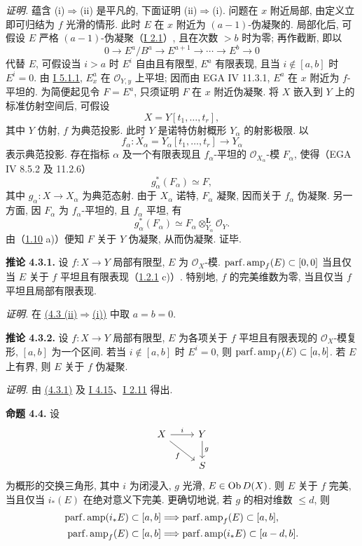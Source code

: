 \emph{证明.} 蕴含 (i)\(\Rightarrow\)(ii) 是平凡的, 下面证明 (ii)\(\Rightarrow\)(i). 问题在 \(x\) 附近局部, 由定义立即可归结为 \(f\) 光滑的情形. 此时 \(E\) 在 \(x\) 附近为 \((a-1)\)-伪凝聚的. 局部化后, 可假设 \(E\) 严格 \((a-1)\)-伪凝聚（\hyperlink{sga6.e01.def.2-1}{I 2.1}）, 且在次数 \(>b\) 时为零; 再作截断, 即以
\[
0\longrightarrow E^a/B^a\longrightarrow E^{a+1}\longrightarrow\cdots\longrightarrow E^b\longrightarrow0
\]
代替 \(E\), 可假设当 \(i>a\) 时 \(E^i\) 自由且有限型, \(E^a\) 有限表现, 且当 \(i\notin[a,b]\) 时 \(E^i=0\). 由 \hyperlink{sga6.e01.lem.5-1-1}{I 5.1.1}, \(E_x^a\) 在 \(\mathcal O_{Y,y}\) 上平坦; 因而由 EGA IV 11.3.1, \(E^a\) 在 \(x\) 附近为 \(f\)-平坦的. 为简便起见令 \(F=E^a\), 只须证明 \(F\) 在 \(x\) 附近伪凝聚. 将 \(X\) 嵌入到 \(Y\) 上的标准仿射空间后, 可假设
\[
X=Y[t_1,\ldots,t_r],
\]
其中 \(Y\) 仿射, \(f\) 为典范投影. 此时 \(Y\) 是诺特仿射概形 \(Y_\alpha\) 的射影极限. 以
\[
f_\alpha:X_\alpha=Y_\alpha[t_1,\ldots,t_r]\longrightarrow Y_\alpha
\]
表示典范投影. 存在指标 \(\alpha\) 及一个有限表现且 \(f_\alpha\)-平坦的 \(\mathcal O_{X_\alpha}\)-模 \(F_\alpha\), 使得（EGA IV 8.5.2 及 11.2.6）
\[
g_\alpha^*(F_\alpha)\simeq F,
\]
其中 \(g_\alpha:X\to X_\alpha\) 为典范态射. 由于 \(X_\alpha\) 诺特, \(F_\alpha\) 凝聚, 因而关于 \(f_\alpha\) 伪凝聚. 另一方面, 因 \(F_\alpha\) 为 \(f_\alpha\)-平坦的, 且 \(f_\alpha\) 平坦, 有
\[
g_\alpha^*(F_\alpha)\simeq F_\alpha\otimes_{Y_\alpha}^{\mathbf L}\mathcal O_Y.
\]
由（\hyperlink{sga6.e03.cor.1-10}{1.10} a)）便知 \(F\) 关于 \(Y\) 伪凝聚, 从而伪凝聚. 证毕.

\textbf{推论 4.3.1.} 设 \(f:X\to Y\) 局部有限型, \(E\) 为 \(\mathcal O_X\)-模. \(\operatorname{parf.amp}_f(E)\subset[0,0]\) 当且仅当 \(E\) 关于 \(f\) 平坦且有限表现（\hyperlink{sga6.e03.rem.1-2-1}{1.2.1} c)）. 特别地, \(f\) 的完美维数为零, 当且仅当 \(f\) 平坦且局部有限表现.

\emph{证明.} 在 \hyperlink{sga6.e03.prop.4-3}{(4.3 (ii)$\Rightarrow$(i))} 中取 \(a=b=0\).

\textbf{推论 4.3.2.} 设 \(f:X\to Y\) 局部有限型, \(E\) 为各项关于 \(f\) 平坦且有限表现的 \(\mathcal O_X\)-模复形, \([a,b]\) 为一个区间. 若当 \(i\notin[a,b]\) 时 \(E^i=0\), 则 \(\operatorname{parf.amp}_f(E)\subset[a,b]\). 若 \(E\) 上有界, 则 \(E\) 关于 \(f\) 伪凝聚.

\emph{证明.} 由 \hyperlink{sga6.e03.cor.4-3-1}{(4.3.1)} 及 \hyperlink{sga6.e01.prop.4-15}{I 4.15}、\hyperlink{sga6.e01.prop.2-11}{I 2.11} 得出.

\textbf{命题 4.4.} 设
\[
\begin{tikzcd}
X\arrow[r,"i"]\arrow[dr,"f"']&Y\arrow[d,"g"]\\&S
\end{tikzcd}
\]
为概形的交换三角形, 其中 \(i\) 为闭浸入, \(g\) 光滑, \(E\in\operatorname{Ob} D(X)\). 则 \(E\) 关于 \(f\) 完美, 当且仅当 \(i_*(E)\) 在绝对意义下完美. 更确切地说, 若 \(g\) 的相对维数 \(\leq d\), 则
\begin{align*}
\operatorname{parf.amp}(i_*E)
  \subset[a,b]&\Longrightarrow \operatorname{parf.amp}_f(E)
  \subset[a,b],\\
\operatorname{parf.amp}_f(E)
  \subset[a,b]&\Longrightarrow \operatorname{parf.amp}(i_*E)
  \subset[a-d,b].
\end{align*}


